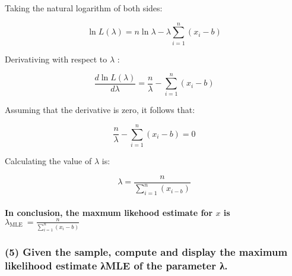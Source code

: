 \documentclass[
]{article}
\begin{document}
Taking the natural logarithm of both sides:

\[
\begin{equation*}
\ln L(\lambda)=n \ln \lambda-\lambda \sum_{i=1}^{n}\left(x_{i}-b\right) \tag{2}
\end{equation*}
\]

Derivativing with respect to \(\lambda\) :

\[
\begin{equation*}
\frac{d \ln L(\lambda)}{d \lambda}=\frac{n}{\lambda}-\sum_{i=1}^{n}\left(x_{i}-b\right) \tag{3}
\end{equation*}
\]

Assuming that the derivative is zero, it follows that:

\[
\begin{equation*}
\frac{n}{\lambda}-\sum_{i=1}^{n}\left(x_{i}-b\right)=0 \tag{4}
\end{equation*}
\]

Calculating the value of \(\lambda\) is:

\[
\begin{equation*}
\lambda=\frac{n}{\sum_{i=1}^{n}\left(x_{i-b}\right)} \tag{5}
\end{equation*}
\]

\paragraph{\texorpdfstring{In conclusion, the maxmum likehood estimate
for \(x\) is
\(\lambda_{\text {MLE }}=\frac{n}{\sum_{i=1}^{n}\left(x_{i}-b\right)}\)}{In conclusion, the maxmum likehood estimate for x is \textbackslash lambda\_\{\textbackslash text \{MLE \}\}=\textbackslash frac\{n\}\{\textbackslash sum\_\{i=1\}\^{}\{n\}\textbackslash left(x\_\{i\}-b\textbackslash right)\}}}\label{in-conclusion-the-maxmum-likehood-estimate-for-x-is-lambda_text-mle-fracnsum_i1nleftx_i-bright}

\subsubsection{(5) Given the sample, compute and display the maximum
likelihood estimate λMLE of the parameter
λ.}\label{given-the-sample-compute-and-display-the-maximum-likelihood-estimate-ux3bbmle-of-the-parameter-ux3bb.}
\end{document}
